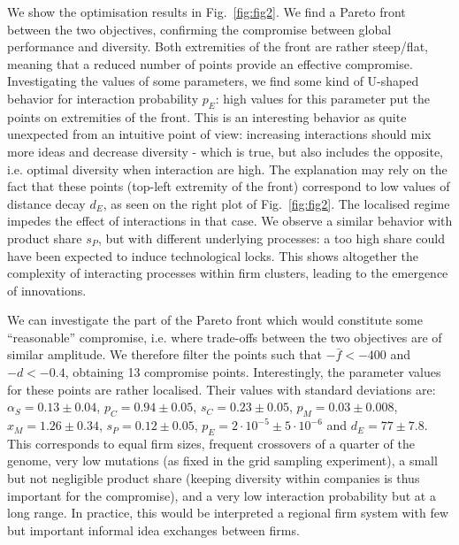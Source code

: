 \documentclass[letterpaper]{article}
\begin{document}
We show the optimisation results in Fig.~\ref{fig:fig2}. We find a Pareto front between the two objectives, confirming the compromise between global performance and diversity. Both extremities of the front are rather steep/flat, meaning that a reduced number of points provide an effective compromise. Investigating the values of some parameters, we find some kind of U-shaped behavior for interaction probability $p_E$: high values for this parameter put the points on extremities of the front. This is an interesting behavior as quite unexpected from an intuitive point of view: increasing interactions should mix more ideas and decrease diversity - which is true, but also includes the opposite, i.e. optimal diversity when interaction are high. The explanation may rely on the fact that these points (top-left extremity of the front) correspond to low values of distance decay $d_E$, as seen on the right plot of Fig.~\ref{fig:fig2}. The localised regime impedes the effect of interactions in that case. We observe a similar behavior with product share $s_P$, but with different underlying processes: a too high share could have been expected to induce technological locks. This shows altogether the complexity of interacting processes within firm clusters, leading to the emergence of innovations.

We can investigate the part of the Pareto front which would constitute some ``reasonable'' compromise, i.e. where trade-offs between the two objectives are of similar amplitude. We therefore filter the points such that $- \bar{f} < -400$ and $-d < -0.4$, obtaining 13 compromise points. Interestingly, the parameter values for these points are rather localised. Their values with standard deviations are: $\alpha_S = 0.13 \pm 0.04$, $p_C = 0.94 \pm 0.05$, $s_C = 0.23 \pm 0.05$, $p_M = 0.03 \pm 0.008$, $x_M = 1.26 \pm 0.34 $, $s_P = 0.12 \pm 0.05$, $p_E = 2 \cdot 10^{-5} \pm 5 \cdot 10^{-6}$ and $d_E = 77 \pm 7.8$. This corresponds to equal firm sizes, frequent crossovers of a quarter of the genome, very low mutations (as fixed in the grid sampling experiment), a small but not negligible product share (keeping diversity within companies is thus important for the compromise), and a very low interaction probability but at a long range. In practice, this would be interpreted a regional firm system with few but important informal idea exchanges between firms.

\end{document}
